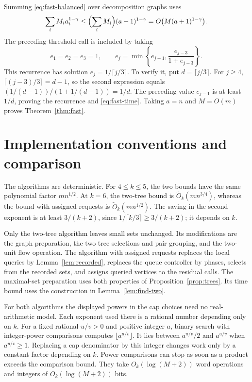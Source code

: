 \documentclass[11pt]{article}
\theoremstyle{definition}
\theoremstyle{remark}
\newcommand{\OO}{\widetilde O}
\begin{document}
Summing \eqref{eq:fast-balanced} over decomposition graphs uses
\[
 \sum_i M_i a_i^{1-\gamma}\le\Bigl(\sum_iM_i\Bigr)(a+1)^{1-\gamma}=O\bigl(M(a+1)^{1-\gamma}\bigr).
\]
The preceding-threshold call is included by taking
\[
 e_1=e_2=e_3=1,\qquad
 e_j=\min\left\{e_{j-1},\frac{e_{j-3}}{1+e_{j-3}}\right\}.
\]
This recurrence has solution \(e_j=1/\lceil j/3\rceil\). To verify it, put \(d=\lceil j/3\rceil\). For \(j\ge4\), \(\lceil(j-3)/3\rceil=d-1\), so the second expression equals
\((1/(d-1))/(1+1/(d-1))=1/d\).
The preceding value \(e_{j-1}\) is at least \(1/d\), proving the recurrence and \eqref{eq:fast-time}. Taking \(a=n\) and \(M=O(m)\) proves Theorem~\ref{thm:fast}.

\section{Implementation conventions and comparison}
\label{sec:comparison}
The algorithms are deterministic. For \(4\le k\le5\), the two bounds have the same polynomial factor \(mn^{1/2}\). At \(k=6\), the two-tree bound is \(\OO_k(mn^{3/4})\), whereas the bound with assigned requests is \(\OO_k(mn^{1/2})\). The saving in the second exponent is at least \(3/(k+2)\), since \(1/\lceil k/3\rceil\ge3/(k+2)\); it depends on \(k\).

Only the two-tree algorithm leaves small sets unchanged. Its modifications are the graph preparation, the two tree selections and pair grouping, and the two-unit flow operation. The algorithm with assigned requests replaces the local queries by Lemma~\ref{lem:recorded}, replaces the queue controller by phases, selects from the recorded sets, and assigns queried vertices to the residual calls. The maximal-set preparation uses both properties of Proposition~\ref{prop:trees}. Its time bound uses the construction in Lemma~\ref{lem:find-two}.

For both algorithms the displayed powers in the cap choices need no real-arithmetic model. Each exponent used there is a rational number depending only on \(k\). For a fixed rational \(u/v>0\) and positive integer \(a\), binary search with integer-power comparisons computes \(\lfloor a^{u/v}\rfloor\). It lies between \(a^{u/v}/2\) and \(a^{u/v}\) when \(a^{u/v}\ge1\). Replacing a cap denominator by this integer changes work only by a constant factor depending on \(k\). Power comparisons can stop as soon as a product exceeds the comparison bound. They take \(O_k(\log(M+2))\) word operations and integers of \(O_k(\log(M+2))\) bits.
\end{document}
